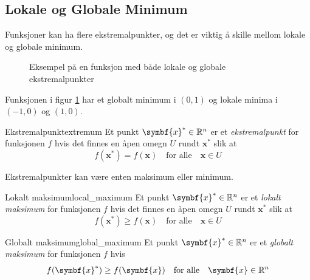\subsection{Lokale og Globale Minimum}
\label{sec:local_global_minimum}
Funksjoner kan ha flere ekstremalpunkter, og det er viktig å skille mellom lokale og globale minimum.
\begin{figure}[H]
	\centering
	\caption{Eksempel på en funksjon med både lokale og globale ekstremalpunkter}
	\label{fig:local_vs_global}
\end{figure}
Funksjonen i figur \ref{fig:local_vs_global} har et globalt minimum i \((0, 1)\) og lokale minima i \((-1, 0)\) og \((1, 0)\).
\begin{definition}{Ekstremalpunkt}{extremum}
	Et punkt \(\symbf{x}^\ast \in \R^n\) er et \textit{ekstremalpunkt} for funksjonen \(f\) hvis det finnes en åpen omegn \(U\) rundt \(\symbf{x}^\ast\) slik at
	\[
		f(\symbf{x}^\ast) = f(\symbf{x}) \quad \text{for alle} \quad \symbf{x} \in U
	\]
\end{definition}
Ekstremalpunkter kan være enten maksimum eller minimum.

\begin{definition}{Lokalt maksimum}{local_maximum}
	Et punkt \(\symbf{x}^\ast \in \R^n\) er et \textit{lokalt maksimum} for funksjonen \(f\) hvis det finnes en åpen omegn \(U\) rundt \(\symbf{x}^\ast\) slik at
	\[
		f(\symbf{x}^\ast) \geq f(\symbf{x}) \quad \text{for alle} \quad \symbf{x} \in U
	\]
\end{definition}
\begin{definition}{Globalt maksimum}{global_maximum}
	Et punkt \(\symbf{x}^\ast \in \R^n\) er et \textit{globalt maksimum} for funksjonen \(f\) hvis
	\[
		f(\symbf{x}^\ast) \geq f(\symbf{x}) \quad \text{for alle} \quad \symbf{x} \in \R^n
	\]
\end{definition}

